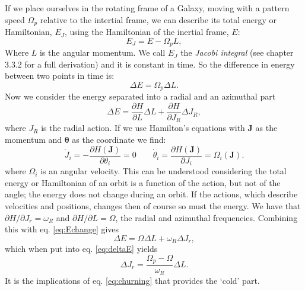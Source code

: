 If we place ourselves in the rotating frame of a Galaxy, moving with a pattern speed $\Omega_p$ relative to the intertial frame, we can describe its total energy or Hamiltonian, $E_J$, using the Hamiltonian of the inertial frame, $E$:
\begin{equation}\label{eq:jacobi}
    E_J = E - \Omega_pL,
\end{equation}
Where $L$ is the angular momentum. We call $E_J$ the \textit{Jacobi integral} (see \citealt{binney:08} chapter 3.3.2 for a full derivation) and it is constant in time. So the difference in energy between two points in time is:
\begin{equation}\label{eq:deltaE}
    \Delta E = \Omega_p\Delta L.
\end{equation}
Now we consider the energy separated into a radial and an azimuthal part
\begin{equation}\label{eq:Echange}
    \Delta E = \frac{\partial H}{\partial L}\Delta L + \frac{\partial H}{\partial J_R}\Delta J_R,
\end{equation}
where $J_R$ is the radial action. If we use Hamilton's equations with $\bm{J}$ as the momentum and $\bm{\theta}$ as the coordinate we find:
\begin{equation}
    \dot{J}_i = - \frac{\partial H(\bm{J})}{\partial \theta_i} = 0 \qquad \dot{\theta}_i = \frac{\partial H(\bm{J})}{\partial J_i} = \Omega_i(\bm{J}).
\end{equation}
where $\Omega_i$ is an angular velocity. This can be understood considering the total energy or Hamiltonian of an orbit is a function of the action, but not of the angle; the energy does not change during an orbit. If the actions, which describe velocities and positions, changes then of course so must the energy. We have that $\partial H / \partial J_r = \omega_R$ and $\partial H / \partial L = \Omega$, the radial and azimuthal frequencies. Combining this with eq. \eqref{eq:Echange} gives
\begin{equation}
    \Delta E = \Omega\Delta L + \omega_R \Delta J_r,
\end{equation}
which when put into eq. \eqref{eq:deltaE} yields
\begin{equation}\label{eq:churning}
    \Delta J_r = \frac{\Omega_p - \Omega}{\omega_R}\Delta L.
\end{equation}
It is the implications of eq. \eqref{eq:churning} that provides the `cold' part. 

